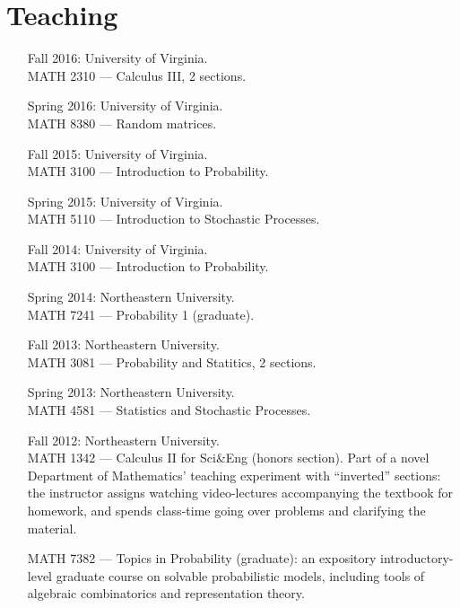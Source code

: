 \documentclass[letterpaper,11pt]{article}
\begin{document}
\section*{Teaching}

\begin{itemize}
	\item[Fall 2016:]
  University of Virginia. \\
  MATH 2310 --- Calculus III, 2 sections.

  \item[Spring 2016:]
  University of Virginia. \\
  MATH 8380 --- Random matrices.

  \item[Fall 2015:]   
  University of Virginia. \\
  MATH 3100 --- Introduction to Probability.

	\item[Spring 2015:]   
	University of Virginia. \\
	MATH 5110 --- Introduction to Stochastic Processes.

	\item[Fall 2014:]   
	University of Virginia. \\
	MATH 3100 --- Introduction to Probability.

  \item[Spring 2014:]   
  Northeastern University. \\
  MATH 7241 --- 
  Probability 1 (graduate).

  \item[Fall 2013:]   
  Northeastern University. \\
  MATH 3081 --- 
  Probability and Statitics, 2 sections.
  \item[Spring 2013:] 
  Northeastern University. 
  \\
  MATH 4581 --- Statistics and Stochastic Processes.
  \item[Fall 2012:]
  Northeastern University. 
  \\
  MATH 1342 --- 
  Calculus II for Sci\&Eng (honors section). Part of a novel Department of Mathematics' teaching experiment with ``inverted'' sections: the instructor assigns watching video-lectures accompanying the textbook for homework, and spends class-time going over problems and clarifying the material.

  MATH 7382 --- Topics in Probability (graduate): an expository introductory-level graduate course on solvable probabilistic models, including tools of algebraic combinatorics and representation theory.


\end{itemize}
\end{document}
